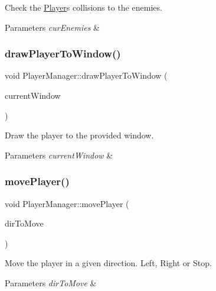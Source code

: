 Check the \hyperlink{class_player}{Player}\textquotesingle{}s collisions to the enemies. 


\begin{DoxyParams}{Parameters}
{\em cur\+Enemies} & \\
\hline
\end{DoxyParams}
\mbox{\label{class_player_manager_a8dfbc91721f7c9cfeae80ae7fa89602e}} 
\subsubsection{\texorpdfstring{draw\+Player\+To\+Window()}{drawPlayerToWindow()}}
{\footnotesize\ttfamily void Player\+Manager\+::draw\+Player\+To\+Window (\begin{DoxyParamCaption}\item[{sf\+::\+Render\+Window $\ast$}]{current\+Window }\end{DoxyParamCaption})}



Draw the player to the provided window. 


\begin{DoxyParams}{Parameters}
{\em current\+Window} & \\
\hline
\end{DoxyParams}
\mbox{\label{class_player_manager_a95358a4f97cf343f5d5d01a440c5dc76}} 
\subsubsection{\texorpdfstring{move\+Player()}{movePlayer()}}
{\footnotesize\ttfamily void Player\+Manager\+::move\+Player (\begin{DoxyParamCaption}\item[{\hyperlink{_player_manager_8h_a00ec4eba48da32d6cbdf827185fd3d34}{Move\+Direction}}]{dir\+To\+Move }\end{DoxyParamCaption})}



Move the player in a given direction. Left, Right or Stop. 


\begin{DoxyParams}{Parameters}
{\em dir\+To\+Move} & \\
\hline
\end{DoxyParams}
\mbox{\label{class_player_manager_a7a61c6484a3dd12293d2481c5f61fb71}} 
